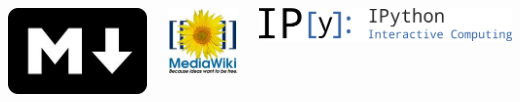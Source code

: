 \documentclass{beamer}
\begin{document}
\begin{frame}
\begin{columns}
\end{columns}
\begin{columns}
\begin{center}  %
  \centerline{\includegraphics[width=0.2\linewidth]{../doc/slides/fig/markdown_logo.jpg}}
\end{center}


\begin{center}  %
  \centerline{\includegraphics[width=0.2\linewidth]{../doc/slides/fig/MediaWiki_logo.jpg}}
\end{center}


\begin{center}  %
  \centerline{\includegraphics[width=0.6\linewidth]{../doc/slides/fig/IPython_logo.png}}
\end{center}


\end{columns}
\end{frame}
\end{document}
